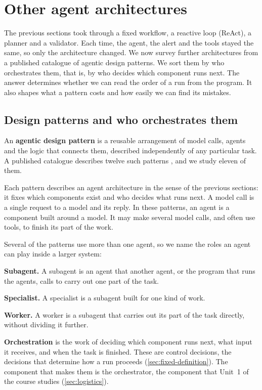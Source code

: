 \section{Other agent architectures}
\label{sec:patterns}

The previous sections took \msa{} through a fixed workflow, a reactive loop (ReAct), a planner and
a validator. Each time, the agent, the alert and the tools stayed the same, so only the
architecture changed. We now survey further architectures from a published catalogue of agentic
design patterns. We sort them by who orchestrates them, that is, by who decides which component
runs next. The answer determines whether we can read the order of a run from the program. It also
shapes what a pattern costs and how easily we can find its mistakes.

\subsection{Design patterns and who orchestrates them}
\label{sec:patterns-catalogue}

An \textbf{agentic design pattern} is a reusable arrangement of model calls, agents and the logic
that connects them, described independently of any particular task. A published catalogue
describes twelve such patterns \citep{google2026patterns}, and we study eleven of them.

Each pattern describes an agent architecture in the sense of the previous sections: it fixes which
components exist and who decides what runs next. A model call is a single request to a model and
its reply. In these patterns, an agent is a component built around a model. It may make several
model calls, and often use tools, to finish its part of the work.

Several of the patterns use more than one agent, so we name the roles an agent can play inside a
larger system:
\bi
\item \textbf{Subagent.} A subagent is an agent that another agent, or the program that runs the
agents, calls to carry out one part of the task.
\item \textbf{Specialist.} A specialist is a subagent built for one kind of work.
\item \textbf{Worker.} A worker is a subagent that carries out its part of the task directly,
without dividing it further.
\ei

\textbf{Orchestration} is the work of deciding which component runs next, what input it receives,
and when the task is finished. These are control decisions, the decisions that determine how a run
proceeds (\cref{sec:fixed-definition}). The component that makes them is the orchestrator, the
component that Unit~1 of the course studies (\cref{sec:logistics}).

